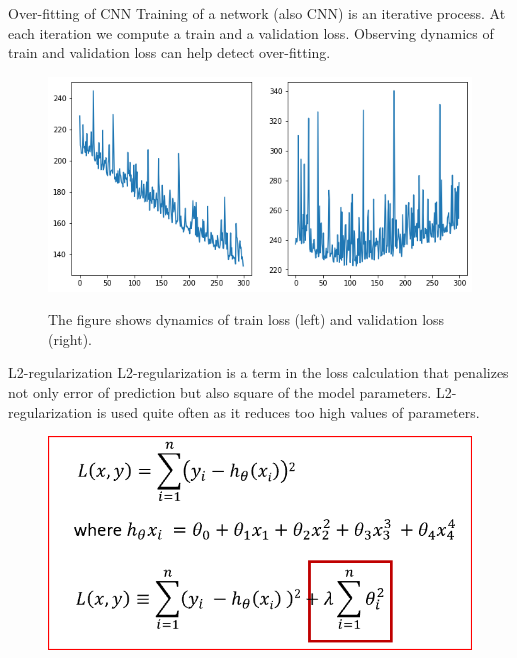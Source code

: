 \documentclass[handout]{beamer}
\begin{document}
\begin{frame}{Over-fitting of CNN}
    Training of a network (also CNN) is an iterative process. At each iteration we compute a train and a validation loss. Observing dynamics of train and validation loss can help detect over-fitting.

    \begin{figure}
        \centering
        \includegraphics[width=.8\textwidth]{fig/L2/regularization_real.png}
        
        {\tiny The figure shows dynamics of train loss (left) and validation loss (right).}
    \end{figure}
\end{frame}

\begin{frame}{L2-regularization}
    L2-regularization is a term in the loss calculation that penalizes not only error of prediction but also \alert{square} of the model parameters. L2-regularization is used quite often as it reduces too high values of parameters.

    \begin{figure}
        \centering
        \includegraphics[width=.8\textwidth]{fig/L2/l2_reg.png}
        
    \end{figure}
\end{frame}
\end{document}
